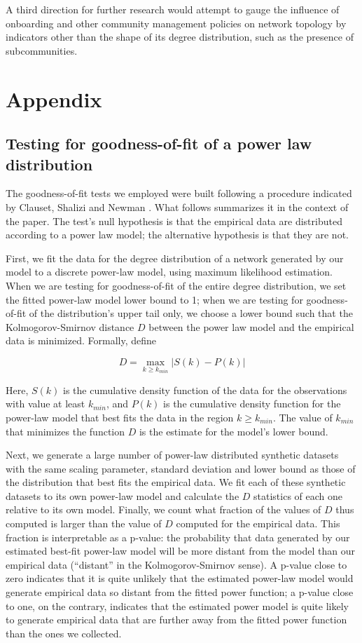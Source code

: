 \documentclass{nws}
\begin{document}
A third direction for further research would attempt to gauge the influence of onboarding and other community management policies on network topology by indicators other than the shape of its degree distribution, such as the presence of subcommunities. 

\section{Appendix}
\subsection{Testing for goodness-of-fit of a power law distribution}

The goodness-of-fit tests we employed were built following a procedure indicated by Clauset, Shalizi and Newman \cite[pp. 15-18]{clauset2009power}. What follows summarizes it in the context of the paper. The test's null hypothesis is that the empirical data are distributed according to a power law model; the alternative hypothesis is that they are not.

First, we fit the data for the degree distribution of a network generated by our model to a discrete power-law model, using maximum likelihood estimation. When we are testing for goodness-of-fit of the entire degree distribution, we set the fitted power-law model lower bound to 1; when we are testing for goodness-of-fit of the distribution's upper tail only, we choose a lower bound  such that the Kolmogorov-Smirnov distance $D$ between the power law model and the empirical data is minimized. Formally, define

$$D = \max_{k \geq k_{min}} | S(k) - P(k) |$$

Here, $S(k)$ is the cumulative density function of the data for the observations with value at least $k_{min}$, and $P(k)$ is the cumulative density function for the power-law model that best fits the data in the region $k \geq k_{min}$. The value of $k_{min}$ that minimizes the function $D$ is the estimate for the model's lower bound.

Next, we generate a large number of power-law distributed synthetic datasets with the same scaling parameter, standard deviation and lower bound as those of the distribution that best fits the empirical data. We fit each of these synthetic datasets to its own power-law model and calculate the $D$ statistics of each one relative to its own model. Finally, we count what fraction of the values of $D$ thus computed is larger than the value of $D$ computed for the empirical data. This fraction is interpretable as a p-value: the probability that data generated by our estimated best-fit power-law model will be more distant from the model than our empirical data (``distant'' in the Kolmogorov-Smirnov sense). A p-value close to zero indicates that it is quite unlikely that the estimated power-law model would generate empirical data so distant from the fitted power function; a p-value close to one, on the contrary, indicates that the estimated power model is quite likely to generate empirical data that are further away from the fitted power function than the ones we collected. 
\end{document}
